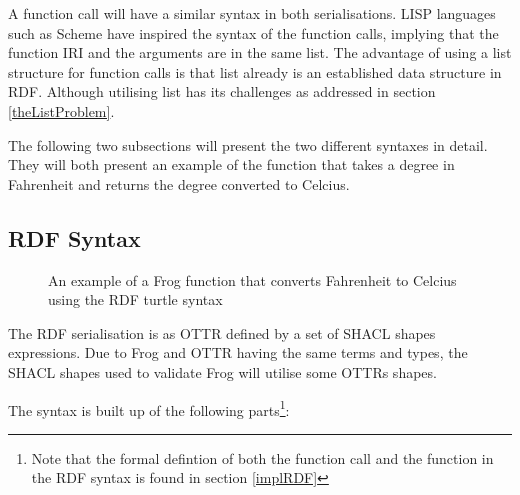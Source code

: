 \para 
A function call will have a similar syntax in both serialisations. LISP languages such as Scheme have inspired the syntax of the function calls, implying that the function IRI and the arguments are in the same list. The advantage of using a list structure for function calls is that list already is an established data structure in RDF. Although utilising list has its challenges as addressed in section \ref{theListProblem}.

\para 
The following two subsections will present the two different syntaxes in detail. They will both present an example of the function that takes a degree in Fahrenheit and returns the degree converted to Celcius. 

\subsection{RDF Syntax}
\label{RDF_syntax}

\begin{figure}[b]
    
    \caption{An example of a Frog function that converts Fahrenheit to Celcius using the RDF turtle syntax}
    \label{fig:rdf_example}
\end{figure}

\para
The RDF serialisation is as OTTR defined by a set of SHACL shapes expressions. Due to Frog and OTTR having the same terms and types, the SHACL shapes used to validate Frog will utilise some OTTRs shapes. 

\para
The syntax is built up of the following parts\footnote{Note that the formal defintion of both the function call and the function in the RDF syntax is found in section \ref{implRDF}}: 

